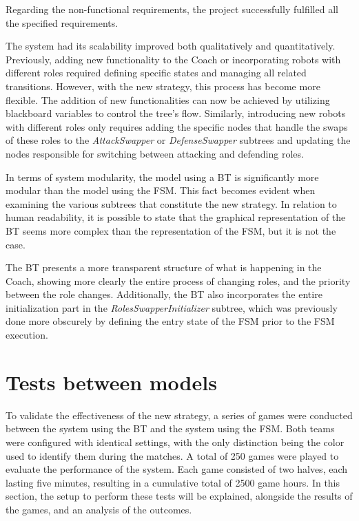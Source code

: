 Regarding the non-functional requirements, the project successfully fulfilled all the specified requirements.

The system had its scalability improved both qualitatively and quantitatively. Previously, adding new functionality to the Coach or incorporating robots with different roles required defining specific states and managing all related transitions. However, with the new strategy, this process has become more flexible. The addition of new functionalities can now be achieved by utilizing blackboard variables to control the tree's flow. Similarly, introducing new robots with different roles only requires adding the specific nodes that handle the swaps of these roles to the \textit{AttackSwapper} or \textit{DefenseSwapper} subtrees and updating the nodes responsible for switching between attacking and defending roles.

In terms of system modularity, the model using a BT is significantly more modular than the model using the FSM. This fact becomes evident when examining the various subtrees that constitute the new strategy. In relation to human readability, it is possible to state that the graphical representation of the BT seems more complex than the representation of the FSM, but it is not the case. 

The BT presents a more transparent structure of what is happening in the Coach, showing more clearly the entire process of changing roles, and the priority between the role changes. Additionally, the BT also incorporates the entire initialization part in the \textit{RolesSwapperInitializer} subtree, which was previously done more obscurely by defining the entry state of the FSM prior to the FSM execution.

\section{Tests between models}

To validate the effectiveness of the new strategy, a series of games were conducted between the system using the BT and the system using the FSM. Both teams were configured with identical settings, with the only distinction being the color used to identify them during the matches. A total of 250 games were played to evaluate the performance of the system. Each game consisted of two halves, each lasting five minutes, resulting in a cumulative total of 2500 game hours. In this section, the setup to perform these tests will be explained, alongside the results of the games, and an analysis of the outcomes.

